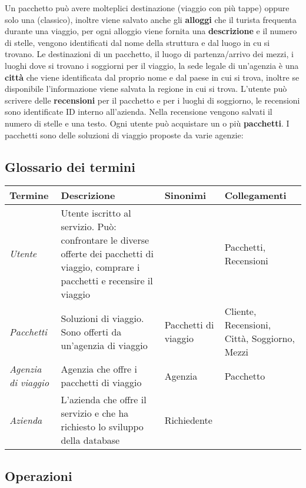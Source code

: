 %
Un pacchetto può avere molteplici destinazione (viaggio con più tappe) oppure solo una (classico), inoltre viene salvato anche gli \textbf{alloggi} che il turista frequenta durante una viaggio, per ogni alloggio viene fornita una \textbf{descrizione} e il numero di stelle, vengono identificati dal nome della struttura e dal luogo in cu si trovano.
%
Le destinazioni di un pacchetto, il luogo di partenza/arrivo dei mezzi, i luoghi dove si trovano i soggiorni per il viaggio, la sede legale di un'agenzia è una \textbf{città} che viene identificata dal proprio nome e dal paese in cui si trova, inoltre se disponibile l'informazione viene salvata la regione in cui si trova.
%
L'utente può scrivere delle \textbf{recensioni} per il pacchetto e per i luoghi di soggiorno, le recensioni sono identificate ID interno all'azienda. Nella recensione vengono salvati il numero di stelle e una testo.
%
Ogni utente può acquistare un o più \textbf{pacchetti}. I pacchetti sono delle soluzioni di viaggio proposte da varie agenzie:
\subsection{Glossario dei termini}
\begin{tabularx}{\textwidth}{XXXX}
    \toprule
    \textbf{Termine} & \textbf{Descrizione} & \textbf{Sinonimi} & \textbf{Collegamenti} \\
    \midrule
    \emph{Utente} & Utente iscritto al servizio. Può: confrontare le diverse offerte dei pacchetti di viaggio, comprare i pacchetti e recensire il viaggio & & Pacchetti, Recensioni
    \\\midrule
    \emph{Pacchetti} & Soluzioni di viaggio. Sono offerti da un'agenzia di viaggio & Pacchetti di viaggio & Cliente, Recensioni, Città, Soggiorno, Mezzi
    \\\midrule
    \emph{Agenzia di viaggio} & Agenzia che offre i pacchetti di viaggio & Agenzia & Pacchetto
    \\\midrule
    \emph{Azienda} & L'azienda  che offre il servizio e  che ha richiesto lo sviluppo della database & Richiedente &
    \\
    \bottomrule
\end{tabularx}

\subsection{Operazioni}

